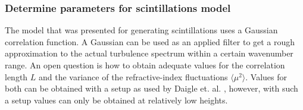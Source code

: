 \subsubsection*{Determine parameters for scintillations model}
The model that was presented for generating scintillations uses a Gaussian
correlation function. A Gaussian can be used as an applied filter to get a rough
approximation to the actual turbulence spectrum within a certain wavenumber
range. An open question is how to obtain adequate values for the correlation
length $L$ and the variance of the refractive-index fluctuations $\langle \mu^2
\rangle$. Values for both can be obtained with a setup as used by Daigle et. al.
\cite{Daigle1983}, however, with such a setup values can only be obtained at
relatively low heights.





